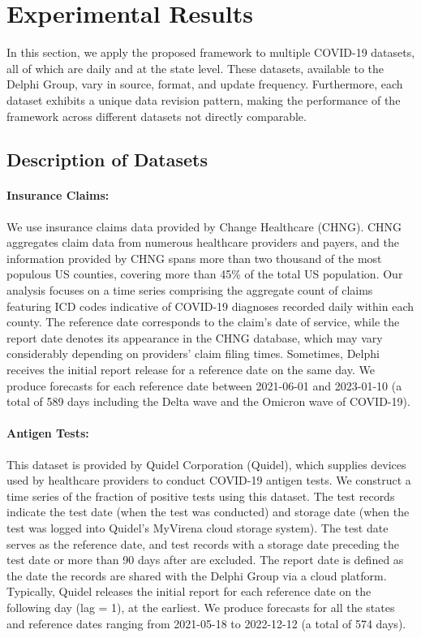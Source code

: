 \section{Experimental Results}
In this section, we apply the proposed framework to multiple COVID-19 datasets, all of which are daily and at the state level. These datasets, available to the Delphi Group, vary in source, format, and update frequency. Furthermore, each dataset exhibits a unique data revision pattern, making the performance of the framework across different datasets not directly comparable.

\subsection{Description of Datasets}
\paragraph{Insurance Claims:} We use insurance claims data provided by Change Healthcare (CHNG). CHNG aggregates claim data from numerous healthcare providers and payers, and the information provided by CHNG spans more than two thousand of the most populous US counties, covering more than 45\% of the total US population. Our analysis focuses on a time series comprising the aggregate count of claims featuring ICD codes indicative of COVID-19 diagnoses recorded daily within each county. The reference date corresponds to the claim's date of service, while the report date denotes its appearance in the CHNG database, which may vary considerably depending on providers' claim filing times. Sometimes, Delphi receives the initial report release for a reference date on the same day. We produce forecasts for each reference date between 2021-06-01 and 2023-01-10 (a total of 589 days including the Delta wave and the Omicron wave of COVID-19). 

\paragraph{Antigen Tests:}
This dataset is provided by Quidel Corporation (Quidel), which supplies devices used by healthcare providers to conduct COVID-19 antigen tests. We construct a time series of the fraction of positive tests using this dataset. The test records indicate the test date (when the test was conducted) and storage date (when the test was logged into Quidel's MyVirena cloud storage system). The test date serves as the reference date, and test records with a storage date preceding the test date or more than 90 days after are excluded. The report date is defined as the date the records are shared with the Delphi Group via a cloud platform. Typically, Quidel releases the initial report for each reference date on the following day (lag = 1), at the earliest. We produce forecasts for all the states and reference dates ranging from 2021-05-18 to 2022-12-12 (a total of 574 days). 

